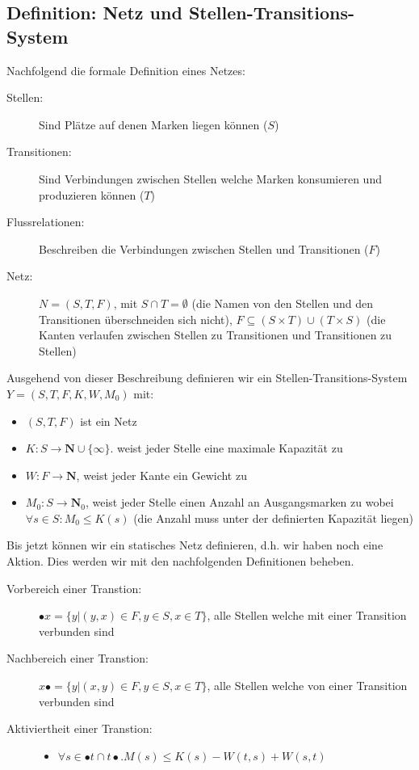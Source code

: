 \documentclass[11pt, fleqn, a4paper, leqno]{scrartcl} %
\begin{document}
	\subsection{Definition: Netz und Stellen-Transitions-System}
		Nachfolgend die formale Definition eines Netzes: 
		\begin{description}
			\item[Stellen:] Sind Plätze auf denen Marken liegen können ($S$)
			\item[Transitionen:] Sind Verbindungen zwischen Stellen welche Marken konsumieren und produzieren können ($T$)
			\item[Flussrelationen:] Beschreiben die Verbindungen zwischen Stellen und Transitionen ($F$)
			\item[Netz:] $N=(S,T,F)$, mit $S \cap T = \emptyset$ (die Namen von den Stellen und den Transitionen überschneiden sich nicht), $F \subseteq (S \times T) \cup (T \times S)$ (die Kanten verlaufen zwischen Stellen zu Transitionen und Transitionen zu Stellen)
		\end{description}
		Ausgehend von dieser Beschreibung definieren wir ein Stellen-Transitions-System $Y=(S,T,F,K,W,M_{0})$ mit:
		\begin{itemize}
			\item $(S,T,F)$ ist ein Netz
			\item $K: S \rightarrow \mathbf{N} \cup \{\infty\}$. weist jeder Stelle eine maximale Kapazität zu
			\item $W: F \rightarrow \mathbf{N}$, weist jeder Kante ein Gewicht zu
			\item $M_{0}: S \rightarrow \mathbf{N}_{0}$, weist jeder Stelle einen Anzahl an Ausgangsmarken zu wobei $\forall s \in S : M_{0} \leq K(s)$ (die Anzahl muss unter der definierten Kapazität liegen)
		\end{itemize}
		Bis jetzt können wir ein statisches Netz definieren, d.h. wir haben noch eine Aktion. Dies werden wir mit den nachfolgenden Definitionen beheben.
		\begin{description}
			\item[Vorbereich einer Transtion:] $\bullet x = \{y|(y,x)\in F, y \in S, x \in T\}$, alle Stellen welche  mit einer Transition verbunden sind
			\item[Nachbereich einer Transtion:] $x\bullet = \{y|(x,y)\in F, y \in S, x \in T\}$, alle Stellen welche von einer Transition verbunden sind
			\item[Aktiviertheit einer Transtion:]
				\begin{itemize}
					\item $\forall s \in \bullet t \cap t \bullet . M(s) \leq K(s) - W(t,s) + W(s,t)$
				\end{itemize}
		\end{description}
\end{document}
